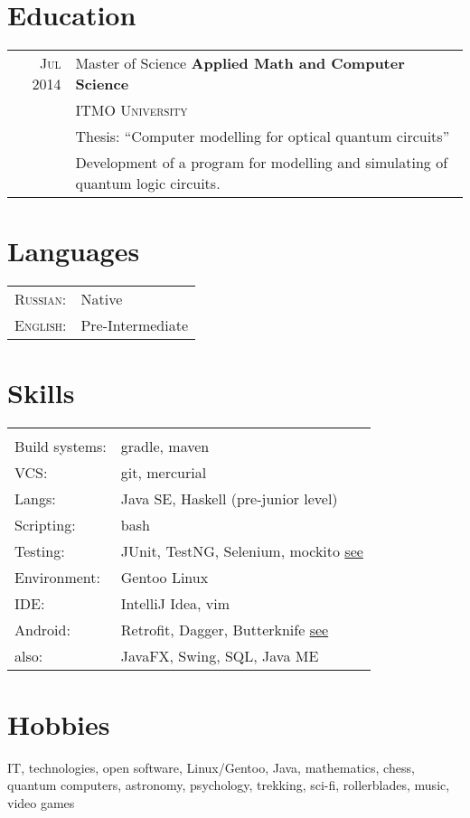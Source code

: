 \documentclass[a4paper,11pt]{article}
\begin{document}
\section{Education}
	\begin{tabular}{rl}	
	  \textsc{Jul 2014} & Master of Science \textbf{ Applied Math and Computer Science} \\& \textsc{ITMO University}\\
			& Thesis: ``Computer modelling for optical quantum circuits''\\&
			Development of a program for modelling and simulating of quantum logic circuits.
	\end{tabular}

\section{Languages}
	\begin{tabular}{ll}
		\textsc{Russian:}&Native\\
		\textsc{English:}&Pre-Intermediate\\
	\end{tabular}

\section{Skills}
	\begin{tabular}{ll}
		\multicolumn{2}{c}{} \\
			Build systems: 	& gradle, maven \\
			VCS: 		& git, mercurial \\
			Langs: 		& Java SE, Haskell (pre-junior level)\\
			Scripting: 	& bash \\ 
			Testing: 	& JUnit, TestNG, Selenium, mockito \href{https://github.com/dbudyak/TestRush}{see}\\
			Environment: 	& Gentoo Linux \\
			IDE: 		& IntelliJ Idea, vim \\
			Android:	& Retrofit, Dagger, Butterknife \href{https://github.com/dbudyak/TheTVDB}{see} \\
			also: 		& JavaFX, Swing, SQL, Java ME
	\end{tabular}

\section{Hobbies}
	IT, technologies, open software, Linux/Gentoo, Java, mathematics, chess, quantum computers, astronomy, 
	psychology, trekking, sci-fi, rollerblades, music, video games
\end{document}
